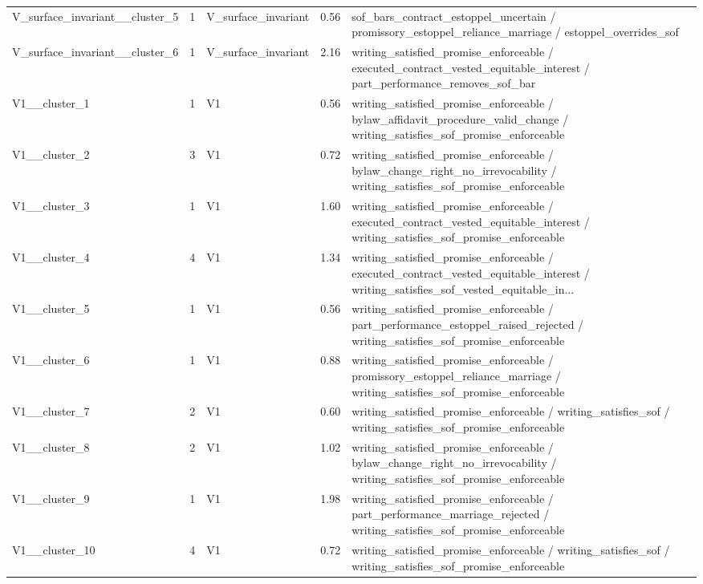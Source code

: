 \begin{tabular}{lllll}
V\_surface\_invariant\_\_cluster\_5 & 1 & V\_surface\_invariant & 0.56 & sof\_bars\_contract\_estoppel\_uncertain / promissory\_estoppel\_reliance\_marriage / estoppel\_overrides\_sof \\
V\_surface\_invariant\_\_cluster\_6 & 1 & V\_surface\_invariant & 2.16 & writing\_satisfied\_promise\_enforceable / executed\_contract\_vested\_equitable\_interest / part\_performance\_removes\_sof\_bar \\
V1\_\_cluster\_1 & 1 & V1 & 0.56 & writing\_satisfied\_promise\_enforceable / bylaw\_affidavit\_procedure\_valid\_change / writing\_satisfies\_sof\_promise\_enforceable \\
V1\_\_cluster\_2 & 3 & V1 & 0.72 & writing\_satisfied\_promise\_enforceable / bylaw\_change\_right\_no\_irrevocability / writing\_satisfies\_sof\_promise\_enforceable \\
V1\_\_cluster\_3 & 1 & V1 & 1.60 & writing\_satisfied\_promise\_enforceable / executed\_contract\_vested\_equitable\_interest / writing\_satisfies\_sof\_promise\_enforceable \\
V1\_\_cluster\_4 & 4 & V1 & 1.34 & writing\_satisfied\_promise\_enforceable / executed\_contract\_vested\_equitable\_interest / writing\_satisfies\_sof\_vested\_equitable\_in... \\
V1\_\_cluster\_5 & 1 & V1 & 0.56 & writing\_satisfied\_promise\_enforceable / part\_performance\_estoppel\_raised\_rejected / writing\_satisfies\_sof\_promise\_enforceable \\
V1\_\_cluster\_6 & 1 & V1 & 0.88 & writing\_satisfied\_promise\_enforceable / promissory\_estoppel\_reliance\_marriage / writing\_satisfies\_sof\_promise\_enforceable \\
V1\_\_cluster\_7 & 2 & V1 & 0.60 & writing\_satisfied\_promise\_enforceable / writing\_satisfies\_sof / writing\_satisfies\_sof\_promise\_enforceable \\
V1\_\_cluster\_8 & 2 & V1 & 1.02 & writing\_satisfied\_promise\_enforceable / bylaw\_change\_right\_no\_irrevocability / writing\_satisfies\_sof\_promise\_enforceable \\
V1\_\_cluster\_9 & 1 & V1 & 1.98 & writing\_satisfied\_promise\_enforceable / part\_performance\_marriage\_rejected / writing\_satisfies\_sof\_promise\_enforceable \\
V1\_\_cluster\_10 & 4 & V1 & 0.72 & writing\_satisfied\_promise\_enforceable / writing\_satisfies\_sof / writing\_satisfies\_sof\_promise\_enforceable \\
\bottomrule
\end{tabular}
